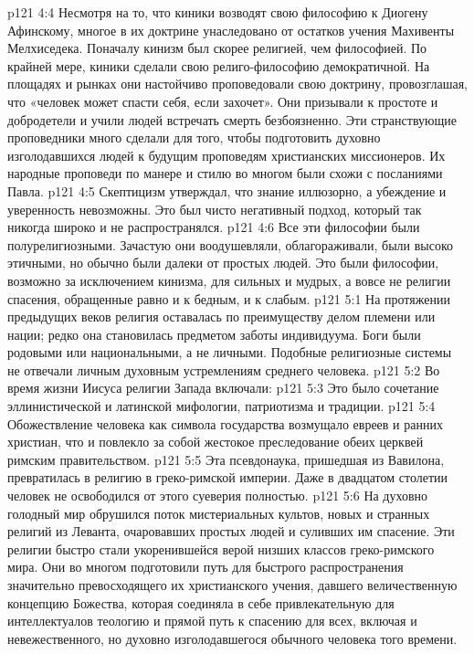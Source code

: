 \vs p121 4:4 \pc {}\bibnobreakspace {} Несмотря на то, что киники возводят свою философию к Диогену Афинскому, многое в их доктрине унаследовано от остатков учения Махивенты Мелхиседека. Поначалу кинизм был скорее религией, чем философией. По крайней мере, киники сделали свою религо\hyp{}философию демократичной. На площадях и рынках они настойчиво проповедовали свою доктрину, провозглашая, что «человек может спасти себя, если захочет». Они призывали к простоте и добродетели и учили людей встречать смерть безбоязненно. Эти странствующие проповедники много сделали для того, чтобы подготовить духовно изголодавшихся людей к будущим проповедям христианских миссионеров. Их народные проповеди по манере и стилю во многом были схожи с посланиями Павла.
\vs p121 4:5 \pc {}\bibnobreakspace {} Скептицизм утверждал, что знание иллюзорно, а убеждение и уверенность невозможны. Это был чисто негативный подход, который так никогда широко и не распространялся.
\vs p121 4:6 \pc Все эти философии были полурелигиозными. Зачастую они воодушевляли, облагораживали, были высоко этичными, но обычно были далеки от простых людей. Это были философии, возможно за исключением кинизма, для сильных и мудрых, а вовсе не религии спасения, обращенные равно и к бедным, и к слабым.
\vs p121 5:1 На протяжении предыдущих веков религия оставалась по преимуществу делом племени или нации; редко она становилась предметом заботы индивидуума. Боги были родовыми или национальными, а не личными. Подобные религиозные системы не отвечали личным духовным устремлениям среднего человека.
\vs p121 5:2 Во время жизни Иисуса религии Запада включали:
\vs p121 5:3 \bibnobreakspace {} Это было сочетание эллинистической и латинской мифологии, патриотизма и традиции.
\vs p121 5:4 \pc {}\bibnobreakspace {} Обожествление человека как символа государства возмущало евреев и ранних христиан, что и повлекло за собой жестокое преследование обеих церквей римским правительством.
\vs p121 5:5 \pc {}\bibnobreakspace {} Эта псевдонаука, пришедшая из Вавилона, превратилась в религию в греко\hyp{}римской империи. Даже в двадцатом столетии человек не освободился от этого суеверия полностью.
\vs p121 5:6 \pc {}\bibnobreakspace {} На духовно голодный мир обрушился поток мистериальных культов, новых и странных религий из Леванта, очаровавших простых людей и суливших им  спасение. Эти религии быстро стали укоренившейся верой низших классов греко\hyp{}римского мира. Они во многом подготовили путь для быстрого распространения значительно превосходящего их христианского учения, давшего величественную концепцию Божества, которая соединяла в себе привлекательную для интеллектуалов теологию и прямой путь к спасению для всех, включая и невежественного, но духовно изголодавшегося обычного человека того времени.

